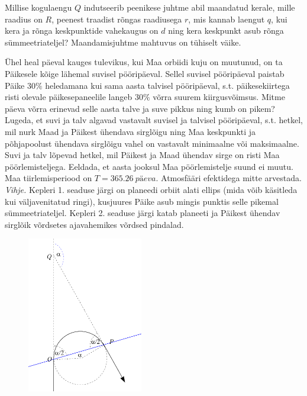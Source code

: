 \documentclass[10pt]{article}
\begin{document}
\setAuthor{}

Millise kogulaengu $Q$ indutseerib peenikese juhtme abil maandatud kerale, mille raadius on $R$, peenest traadist rõngas raadiusega $r$, mis kannab laengut $q$, kui kera ja rõnga keskpunktide vahekaugus on $d$ ning kera keskpunkt asub rõnga sümmeetriateljel? Maandamisjuhtme mahtuvus on tühiselt väike.
\probend
\bigskip


Ühel heal päeval kauges tulevikus, kui Maa orbiidi kuju on muutunud, on ta Päikesele
	kõige lähemal suvisel pööripäeval. Sellel suvisel pööripäeval paistab Päike $30\%$
	heledamana kui sama aasta talvisel pööripäeval, s.t. päikesekiirtega risti olevale
	päikesepaneelile langeb $30\%$ võrra suurem kiirgusvõimsus. Mitme päeva võrra erinevad
	selle aasta talve ja suve pikkus ning kumb on pikem? Lugeda, et suvi ja talv algavad
	vastavalt suvisel ja talvisel pööripäeval, s.t. hetkel, mil nurk Maad ja Päikest ühendava
	sirglõigu ning Maa keskpunkti ja põhjapoolust ühendava sirglõigu vahel on vastavalt
	minimaalne või maksimaalne. Suvi ja talv lõpevad hetkel, mil Päikest ja Maad ühendav
	sirge on risti Maa pöörlemisteljega. Eeldada, et aasta jooksul Maa pöörlemistelje suund ei muutu. Maa tiirlemisperiood on $T=\SI{365.26}{päeva}$.
	Atmosfääri efektidega mitte arvestada.\\
	\textit{Vihje.} Kepleri 1. seaduse järgi on planeedi orbiit alati ellips (mida võib käsitleda kui väljavenitatud ringi), kusjuures Päike asub mingis punktis selle pikemal sümmeetriateljel. Kepleri 2. seaduse järgi katab planeeti ja Päikest ühendav sirglõik
	võrdsetes ajavahemikes võrdsed pindalad.
	
	\vspace{-4pt}
\probend
\bigskip

\setAuthor{}

\begin{figure}
\vspace{-15pt}
\includegraphics[width = 0.45\textwidth]{2020-v2g-09-yl.pdf}
\end{figure}
\end{document}
